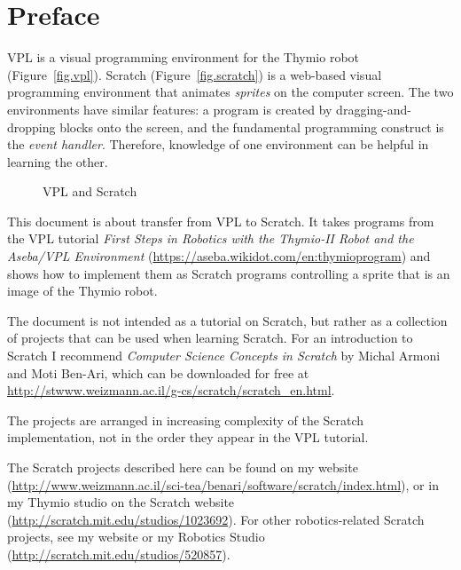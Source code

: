 \chapter*{Preface}


VPL is a visual programming environment for the Thymio robot
(Figure~\ref{fig.vpl}). Scratch (Figure~\ref{fig.scratch}) is a
web-based visual programming environment that animates \emph{sprites} on
the computer screen. The two environments have similar features: a
program is created by dragging-and-dropping blocks onto the screen, and
the fundamental programming construct is the \emph{event handler}.
Therefore, knowledge of one environment can be helpful in learning the
other.

\begin{figure}[hb]
\centering
	\hspace{1.5cm}
    \caption{VPL and Scratch}
    \label{fig.vplscratch}
\end{figure}

This document is about transfer from VPL to Scratch. It takes programs
from the VPL tutorial \emph{First Steps in Robotics with the Thymio-II
Robot and the Aseba/VPL Environment}
(\url{https://aseba.wikidot.com/en:thymioprogram}) and shows how to
implement them as Scratch programs controlling a sprite that is an
image of the Thymio robot.


The document is not intended as a tutorial on Scratch, but
rather as a collection of projects that can be used when learning
Scratch. For an introduction to Scratch I recommend \textit{Computer
Science Concepts in Scratch} by Michal Armoni and Moti Ben-Ari, which
can be downloaded for free at
\url{http://stwww.weizmann.ac.il/g-cs/scratch/scratch_en.html}.

The projects are arranged in increasing complexity of the Scratch
implementation, not in the order they appear in the VPL tutorial.

The Scratch projects described here can be found on my website
(\url{http://www.weizmann.ac.il/sci-tea/benari/software/scratch/index.html}),
or in my Thymio studio on the Scratch website
(\url{http://scratch.mit.edu/studios/1023692}). For other
robotics-related Scratch projects, see my website or my Robotics
Studio (\url{http://scratch.mit.edu/studios/520857}).

